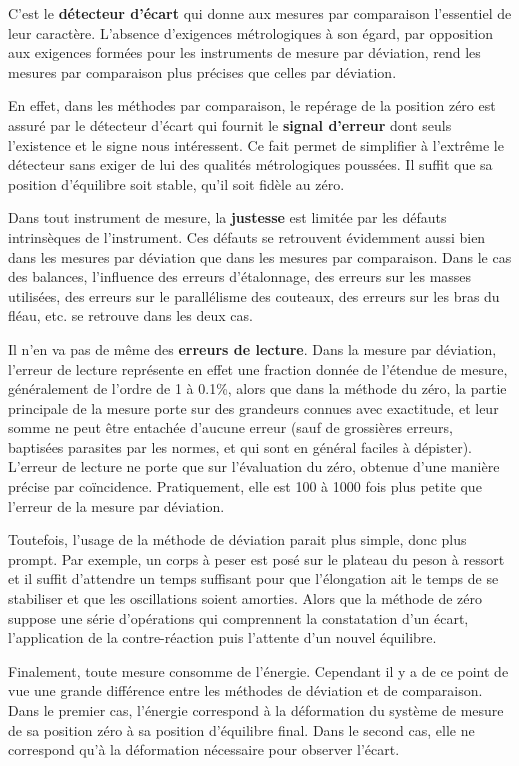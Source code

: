 C'est le \textbf{détecteur d'écart} qui donne aux mesures par comparaison l'essentiel de leur caractère. L'absence d'exigences métrologiques à son égard, par opposition aux exigences formées pour les instruments de mesure par déviation, rend les mesures par comparaison plus précises que celles par déviation.

En effet, dans les méthodes par comparaison, le repérage de la position zéro est assuré par le détecteur d'écart qui fournit le \textbf{signal d'erreur} dont seuls l'existence et le signe nous intéressent. Ce fait permet de simplifier à l'extrême le détecteur sans exiger de lui des qualités métrologiques poussées. Il suffit que sa position d'équilibre soit stable, qu'il soit fidèle au zéro.

Dans tout instrument de mesure, la \textbf{justesse} est limitée par les défauts intrinsèques de l'instrument. Ces défauts se retrouvent évidemment aussi bien dans les mesures par déviation que dans les mesures par comparaison. Dans le cas des balances, l'influence des erreurs d'étalonnage, des erreurs sur les masses utilisées, des erreurs sur le parallélisme des couteaux, des erreurs sur les bras du fléau, etc. se retrouve dans les deux cas.

Il n'en va pas de même des \textbf{erreurs de lecture}. Dans la mesure par déviation, l'erreur de lecture représente en effet une fraction donnée de l'étendue de mesure, généralement de l'ordre de 1 à 0.1\%, alors que dans la méthode du zéro, la partie principale de la mesure porte sur des grandeurs connues avec exactitude, et leur somme ne peut être entachée d'aucune erreur (sauf de grossières erreurs, baptisées parasites par les normes, et qui sont en général faciles à dépister). L'erreur de lecture ne porte que sur l'évaluation du zéro, obtenue d'une manière précise par coïncidence. Pratiquement, elle est 100 à 1000 fois plus petite que l'erreur de la mesure par déviation.

Toutefois, l'usage de la méthode de déviation parait plus simple, donc plus prompt. Par exemple, un corps à peser est posé sur le plateau du peson à ressort et il suffit d'attendre un temps suffisant pour que l'élongation ait le temps de se stabiliser et que les oscillations soient amorties. Alors que la méthode de zéro suppose une série d'opérations qui comprennent la constatation d'un écart, l'application de la contre-réaction puis l'attente d'un nouvel équilibre.

Finalement, toute mesure consomme de l'énergie. Cependant il y a de ce point de vue une grande différence entre les méthodes de déviation et de comparaison. Dans le premier cas, l'énergie correspond à la déformation du système de mesure de sa position zéro à sa position d'équilibre final. Dans le second cas, elle ne correspond qu'à la déformation nécessaire pour observer l'écart.

